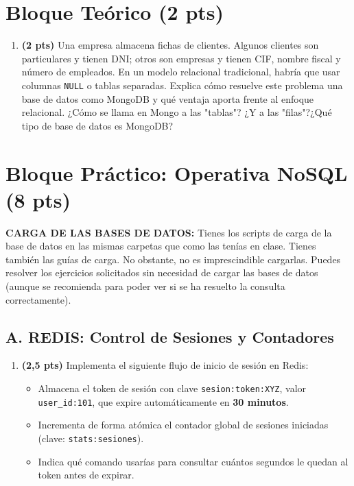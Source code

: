 \documentclass[a4paper,11pt]{article}
\begin{document}
\begin{Form}
\section{Bloque Teórico (2 pts)}
\begin{enumerate}[leftmargin=*, label=\textbf{T.\arabic*:}]
    \item \textbf{(2 pts)} Una empresa almacena fichas de clientes. Algunos clientes son particulares y tienen DNI; otros son empresas y tienen CIF, nombre fiscal y número de empleados. En un modelo relacional tradicional, habría que usar columnas \texttt{NULL} o tablas separadas. Explica cómo resuelve este problema una base de datos como MongoDB y qué ventaja aporta frente al enfoque relacional.
    ¿Cómo se llama en Mongo a las "tablas"? ¿Y a las "filas"?¿Qué tipo de base de datos es MongoDB?
\end{enumerate}

\section{Bloque Práctico: Operativa NoSQL (8 pts)}

\begin{tcolorbox}[colframe=alert, title=RECOMENDACIÓN]
\textbf{CARGA DE LAS BASES DE DATOS:} Tienes los scripts de carga de la base de datos en las mismas carpetas que como las tenías en clase. 
%
Tienes también las guías de carga. No obstante, no es imprescindible cargarlas. 
%
Puedes resolver los ejercicios solicitados sin necesidad de cargar las bases de datos (aunque se recomienda para poder ver si se ha resuelto la consulta correctamente).
\end{tcolorbox}

\subsection*{A. REDIS: Control de Sesiones y Contadores}
\begin{enumerate}[leftmargin=*, label=\textbf{P.R\arabic*:}]
    \item \textbf{(2,5 pts)} Implementa el siguiente flujo de inicio de sesión en Redis:
    \begin{itemize}
        \item Almacena el token de sesión con clave \texttt{sesion:token:XYZ}, valor \texttt{user\_id:101}, que expire automáticamente en \textbf{30 minutos}.
        \item Incrementa de forma atómica el contador global de sesiones iniciadas (clave: \texttt{stats:sesiones}).
        \item Indica qué comando usarías para consultar cuántos segundos le quedan al token antes de expirar.
    \end{itemize}
\end{enumerate}


\end{Form}
\end{document}
